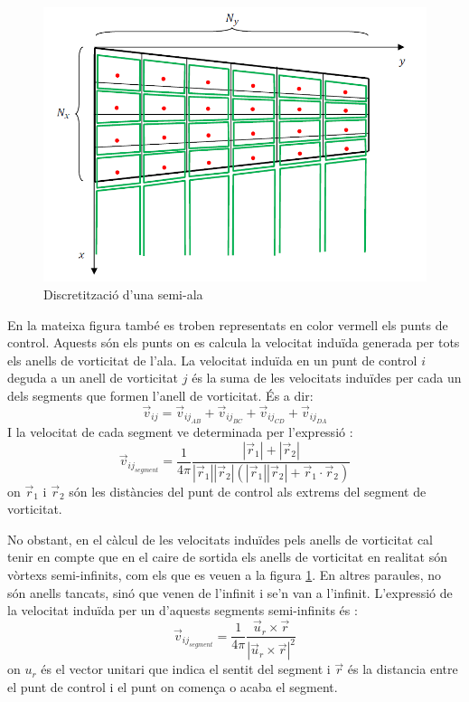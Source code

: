 \begin{figure}[h]
	\centering
	\includegraphics[scale=0.5]{./plots/discretitzacio}
	\caption[Discretització d'una semi-ala]{Discretització d'una semi-ala \cite{LizandraDalmases2017b}}
	\label{discretit}
\end{figure}

En la mateixa figura també es troben representats en color vermell els punts de control. Aquests són els punts on es calcula la velocitat induïda generada per tots els anells de vorticitat de l'ala. La velocitat induïda en un punt de control $i$ deguda a un anell de vorticitat $j$ és la suma de les velocitats induïdes per cada un dels segments que formen l'anell de vorticitat. És a dir:
\begin{equation}
\vec{v}_{ij}=\vec{v}_{ij_{AB}}+\vec{v}_{ij_{BC}}+\vec{v}_{ij_{CD}}+\vec{v}_{ij_{DA}}
\end{equation}
I la velocitat de cada segment ve determinada per l'expressió \cite{LizandraDalmases2017}:
\begin{equation}
\vec{v}_{ij_{segment}}=\frac{1}{4\pi}\frac{|\vec{r}_{1}|+|\vec{r}_{2}|}{|\vec{r}_{1}||\vec{r}_{2}|(|\vec{r}_{1}||\vec{r}_{2}|+\vec{r}_{1}\cdot\vec{r}_{2})}
\end{equation}
on $\vec{r}_{1}$ i $\vec{r}_{2}$ són les distàncies del punt de control als extrems del segment de vorticitat.

No obstant, en el càlcul de les velocitats induïdes pels anells de vorticitat cal tenir en compte que en el caire de sortida els anells de vorticitat en realitat són vòrtexs semi-infinits, com els que es veuen a la figura \ref{discretit}. En altres paraules, no són anells tancats, sinó que venen de l'infinit i se'n van a l'infinit. L'expressió de la velocitat induïda per un d'aquests segments semi-infinits és \cite{LizandraDalmases2017}:
\begin{equation}
\vec{v}_{ij_{segment}}=\frac{1}{4\pi}\frac{\vec{u}_{r}\times\vec{r}}{|\vec{u}_{r}\times\vec{r}|^{2}}
\end{equation}
on $u_{r}$ és el vector unitari que indica el sentit del segment i $\vec{r}$ és la distancia entre el punt de control i el punt on comença o acaba el segment.

